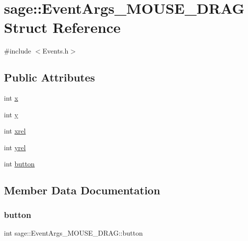 \hypertarget{structsage_1_1EventArgs__MOUSE__DRAG}{}\section{sage\+::Event\+Args\+\_\+\+M\+O\+U\+S\+E\+\_\+\+D\+R\+AG Struct Reference}
\label{structsage_1_1EventArgs__MOUSE__DRAG}


{\ttfamily \#include $<$Events.\+h$>$}

\subsection*{Public Attributes}
\begin{DoxyCompactItemize}
\item 
int \mbox{\hyperlink{structsage_1_1EventArgs__MOUSE__DRAG_a6fa7dfc67cf39558dd103674b74760aa}{x}}
\item 
int \mbox{\hyperlink{structsage_1_1EventArgs__MOUSE__DRAG_a0f7d1535040136747d6bade7f385b027}{y}}
\item 
int \mbox{\hyperlink{structsage_1_1EventArgs__MOUSE__DRAG_aff9f0f045812859a6e9c6417ab5a414f}{xrel}}
\item 
int \mbox{\hyperlink{structsage_1_1EventArgs__MOUSE__DRAG_ab00ed7261a4984465f2b6c23fb9e4329}{yrel}}
\item 
int \mbox{\hyperlink{structsage_1_1EventArgs__MOUSE__DRAG_a3b123d63b7e0ae1336c9ef5b4f363609}{button}}
\end{DoxyCompactItemize}


\subsection{Member Data Documentation}
\mbox{\label{structsage_1_1EventArgs__MOUSE__DRAG_a3b123d63b7e0ae1336c9ef5b4f363609}} 
\subsubsection{\texorpdfstring{button}{button}}
{\footnotesize\ttfamily int sage\+::\+Event\+Args\+\_\+\+M\+O\+U\+S\+E\+\_\+\+D\+R\+A\+G\+::button}

\mbox{\label{structsage_1_1EventArgs__MOUSE__DRAG_a6fa7dfc67cf39558dd103674b74760aa}} 
